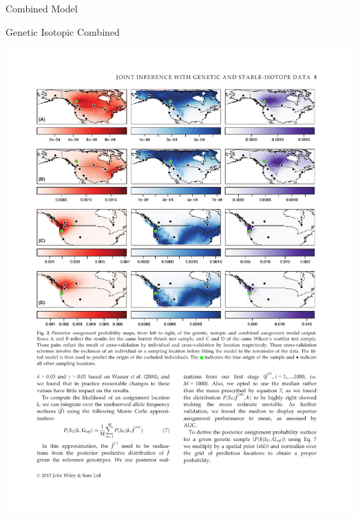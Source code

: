 \documentclass[11pt,ignorenonframetext,]{beamer}
\begin{document}
\begin{frame}{Combined Model}
\protect\hypertarget{combined-model}{}

\begin{center}
Genetic \qquad\qquad\qquad\quad
Isotopic \qquad\qquad\qquad\quad
Combined
\end{center}

\begin{center}
\includegraphics[width=\textwidth]{figs/hermit_maps.pdf}
\end{center}

\end{frame}
\end{document}
